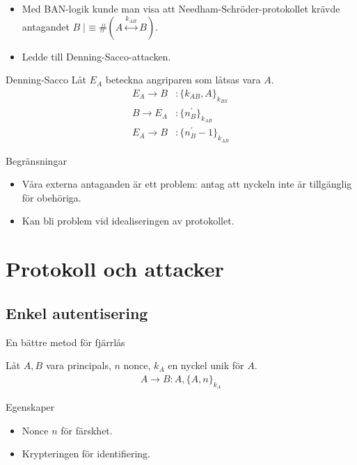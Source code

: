 \documentclass{beamer}
\theoremstyle{definition}
\theoremstyle{remark}
\DeclareMathOperator{\believes}{|\!\!\!\equiv}
\newcommand{\fresh}[1]{\#(#1)}
\newcommand{\encrypt}[2]{\{#1\}_{#2}}
\newcommand{\share}[1]{\stackrel{#1}{\leftrightarrow}}
\begin{document}
\begin{frame}{\insertsubsectionhead}
  \begin{itemize}
    \item Med BAN-logik kunde man visa att Needham-Schröder-protokollet krävde 
      antagandet \(B\believes \fresh{A\share{k_{AB}} B}\).
    \item Ledde till Denning-Sacco-attacken.
  \end{itemize}
  \begin{block}{Denning-Sacco}
    Låt \(E_A\) beteckna angriparen som låtsas vara \(A\).
    \begin{align*}
      E_A\to B &\colon \encrypt{k_{AB}, A}{k_{BS}} \\
      B\to E_A &\colon \encrypt{n_B^\prime}{k_{AB}} \\
      E_A\to B &\colon \encrypt{n_B^\prime-1}{k_{AB}}
    \end{align*}
  \end{block}
\end{frame}

\begin{frame}{\insertsubsectionhead}{Begränsningar}
  \begin{itemize}
    \item Våra externa antaganden är ett problem: antag att nyckeln inte är 
      tillgänglig för obehöriga.

    \item Kan bli problem vid idealiseringen av protokollet.

  \end{itemize}
\end{frame}


\section{Protokoll och attacker}

\subsection{Enkel autentisering}

\begin{frame}{\insertsubsectionhead}{En bättre metod för fjärrlås}
  \begin{example}[Fjärrlås]
    Låt \(A, B\) vara principals, \(n\) nonce, \(k_A\) en nyckel unik för 
    \(A\).
    \begin{align*}
      A\to B\colon A, \encrypt{A, n}{k_A}
    \end{align*}
  \end{example}
  \begin{block}{Egenskaper}
    \begin{itemize}
      \item Nonce \(n\) för färskhet.
      \item Krypteringen för identifiering.
    \end{itemize}
  \end{block}
\end{frame}
\end{document}
